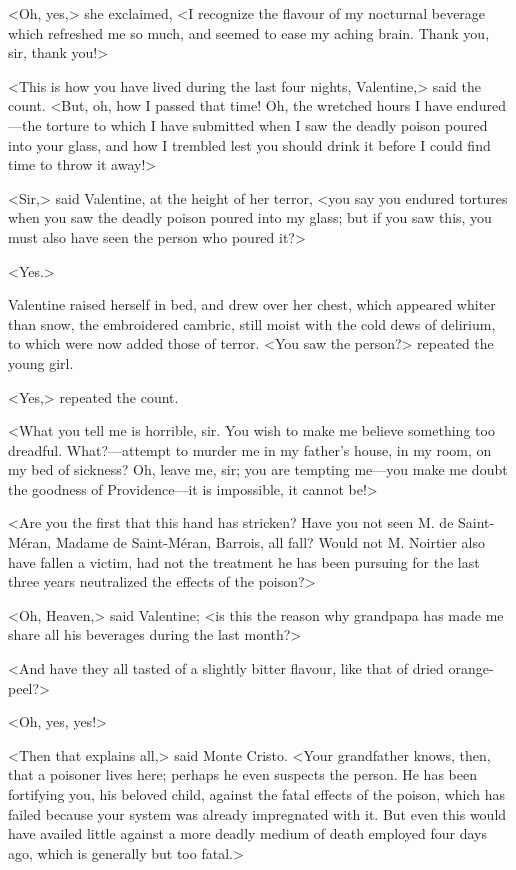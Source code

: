  <Oh, yes,> she exclaimed, <I recognize the flavour of my nocturnal beverage which refreshed me so much, and seemed to ease my aching brain. Thank you, sir, thank you!> 

 <This is how you have lived during the last four nights, Valentine,> said the count. <But, oh, how I passed that time! Oh, the wretched hours I have endured—the torture to which I have submitted when I saw the deadly poison poured into your glass, and how I trembled lest you should drink it before I could find time to throw it away!> 

 <Sir,> said Valentine, at the height of her terror, <you say you endured tortures when you saw the deadly poison poured into my glass; but if you saw this, you must also have seen the person who poured it?> 

 <Yes.> 

 Valentine raised herself in bed, and drew over her chest, which appeared whiter than snow, the embroidered cambric, still moist with the cold dews of delirium, to which were now added those of terror. <You saw the person?> repeated the young girl. 

 <Yes,> repeated the count. 

 <What you tell me is horrible, sir. You wish to make me believe something too dreadful. What?—attempt to murder me in my father's house, in my room, on my bed of sickness? Oh, leave me, sir; you are tempting me—you make me doubt the goodness of Providence—it is impossible, it cannot be!> 

 <Are you the first that this hand has stricken? Have you not seen M. de Saint-Méran, Madame de Saint-Méran, Barrois, all fall? Would not M. Noirtier also have fallen a victim, had not the treatment he has been pursuing for the last three years neutralized the effects of the poison?> 

 <Oh, Heaven,> said Valentine; <is this the reason why grandpapa has made me share all his beverages during the last month?> 

 <And have they all tasted of a slightly bitter flavour, like that of dried orange-peel?> 

 <Oh, yes, yes!> 

 <Then that explains all,> said Monte Cristo. <Your grandfather knows, then, that a poisoner lives here; perhaps he even suspects the person. He has been fortifying you, his beloved child, against the fatal effects of the poison, which has failed because your system was already impregnated with it. But even this would have availed little against a more deadly medium of death employed four days ago, which is generally but too fatal.> 

